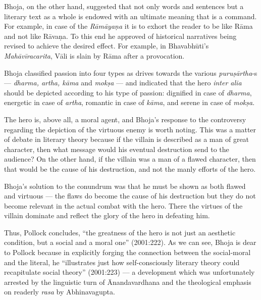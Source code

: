 \vskip 4pt

Bhoja, on the other hand, suggested that not only words and sentences but a literary text as a whole is endowed with an ultimate meaning that is a command. For example, in case of the \textsl{Rāmāyaṇa} it is to exhort the reader to be like Rāma and not like Rāvaṇa. To this end he approved of historical narratives being revised to achieve the desired effect. For example, in Bhavabhūti's \textsl{Mahāvīracarita}, Vāli is slain by Rāma after a provocation. 

\vskip 1pt

Bhoja classified passion into four types as drives towards the various \textsl{puruṣārtha}-s --- \textsl{dharma, artha, kāma} and \textsl{mokṣa} --- and indicated that the hero \textsl{inter alia} should be depicted according to his type of passion: dignified in case of \textsl{dharma}, energetic in case of \textsl{artha}, romantic in case of \textsl{kāma}, and serene in case of \textsl{mokṣa}. 

\vskip 1pt

The hero is, above all, a moral agent, and Bhoja's response to the controversy regarding the depiction of the virtuous enemy is worth noting. This was a matter of debate in literary theory because if the villain is described as a man of great character, then what message would his eventual destruction send to the audience? On the other hand, if the villain was a man of a flawed character, then that would be the cause of his destruction, and not the manly efforts of the hero.

\vskip 1pt

Bhoja's solution to the conundrum was that he must be shown as both flawed and virtuous --- the flaws do become the cause of his destruction but they do not become relevant in the actual combat with the hero. There the virtues of the villain dominate and reflect the glory of the hero in defeating him. 
 
Thus, Pollock concludes, ``the greatness of the hero is not just an aesthetic condition, but a social and a moral one'' (2001:222). As we can see, Bhoja is dear to Pollock because in explicitly forging the connection between the social-moral and the literal, he ``illustrates just how self-consciously literary theory could recapitulate social theory'' (2001:223) --- a development which was unfortunately arrested by the linguistic turn of Ānandavardhana and the theological emphasis on readerly \textsl{rasa} by Abhinavagupta.


